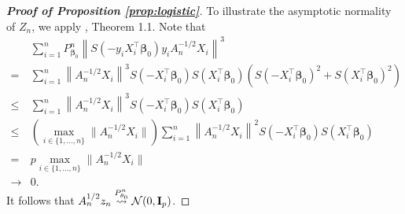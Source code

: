 \documentclass[11pt]{article}
\newcommand{\myT}{\intercal}
\newcommand{\bfsym}[1]{\ensuremath{\boldsymbol{#1}}}
\def\bbeta{\bfsym \beta}
\theoremstyle{plain}
\theoremstyle{definition}
\theoremstyle{remark}
\begin{document}
\begin{proof}[\textbf{Proof of Proposition \ref{prop:logistic}}]
To illustrate the asymptotic normality of $Z_n$, we apply \cite{Raic2019A}, Theorem 1.1.
Note that
\begin{align*}
    &
    \sum_{i=1}^n
    P_{\bbeta_0}^n
 \left\|
 S(-y_i X_i^\myT \bbeta_0)  
 y_i
 A_n^{-1/2}
 X_i
 \right\|^3
 \\
=&
    \sum_{i=1}^n
 \left\|
 A_n^{-1/2}
 X_i
 \right\|^3
 S(- X_i^\myT \bbeta_0)
 S(X_i^\myT \bbeta_0)
 \left(
 S(- X_i^\myT \bbeta_0)^2
 +
 S(X_i^\myT \bbeta_0)^2
\right)
 \\
 \leq&
    \sum_{i=1}^n
 \left\|
 A_n^{-1/2}
 X_i
 \right\|^3
 S(- X_i^\myT \bbeta_0)
 S(X_i^\myT \bbeta_0)
 \\
 \leq&
 \left(
     \max_{i\in \{1,\dots,n\}}
 \|A_n^{-1/2}
 X_i\|
 \right)
    \sum_{i=1}^n
 \left\|
 A_n^{-1/2}
 X_i
 \right\|^2
 S(- X_i^\myT \bbeta_0)
 S(X_i^\myT \bbeta_0)
 \\
 =&
 p
     \max_{i\in \{1,\dots,n\}}
 \|A_n^{-1/2}
 X_i\|
 \\
 \to & 0
 .
\end{align*}
It follows that $A_n^{1/2}z_n \overset{P^n_{\theta_0}}{\rightsquigarrow} \mathcal N (0, \mathbf{I}_p) $.


\end{proof}
\end{document}

